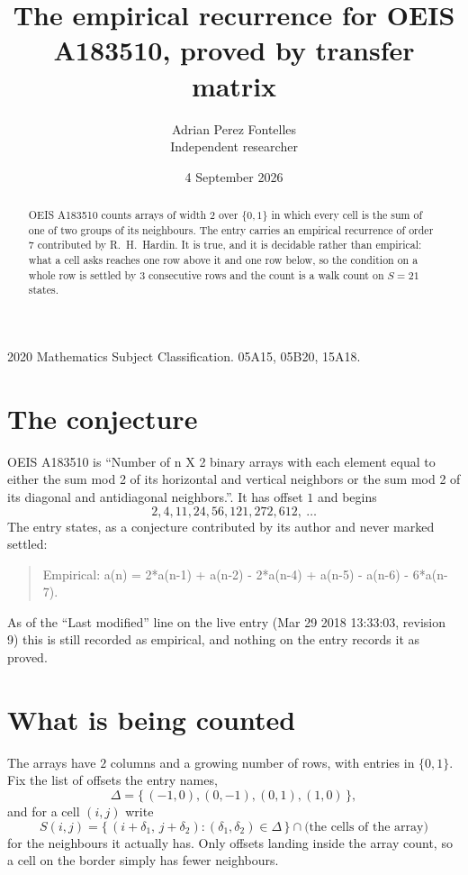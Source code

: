 \documentclass[11pt,a4paper]{article}
\title{The empirical recurrence for OEIS A183510, proved by transfer matrix}
\author{Adrian Perez Fontelles\\ \small Independent researcher}
\date{4 September 2026}
\theoremstyle{plain}
\theoremstyle{definition}
\begin{document}
\maketitle

\begin{abstract}
OEIS A183510 counts arrays of width $2$ over $\{0,1\}$ in which every cell is the sum of one of two groups of its neighbours. The entry carries an
empirical recurrence of order $7$ contributed by R.~H.~Hardin. It is true, and it is
decidable rather than empirical: what a cell asks reaches one row above
it and one row below, so the condition on a whole row is settled by
$3$ consecutive rows and the count is a walk count on $S=21$ states.
\end{abstract}

\noindent\small 2020 Mathematics Subject Classification. 05A15, 05B20, 15A18.\normalsize

\section{The conjecture}

OEIS A183510 is ``Number of n X 2 binary arrays with each element equal to either the sum mod 2 of its horizontal and vertical neighbors or the sum mod 2 of its diagonal and antidiagonal neighbors.''. It has offset $1$ and begins
\[
2, 4, 11, 24, 56, 121, 272, 612,\ \dots
\]
The entry states, as a conjecture contributed by its author and never marked settled:
\begin{quote}
Empirical: a(n) = 2*a(n-1) + a(n-2) - 2*a(n-4) + a(n-5) - a(n-6) - 6*a(n-7).
\end{quote}
As of the ``Last modified'' line on the live entry (Mar 29 2018 13:33:03, revision 9) this is still
recorded as empirical, and nothing on the entry records it as proved.

\section{What is being counted}

The arrays have $2$ columns and a growing number of rows, with entries in $\{0,1\}$. Fix the
list of offsets the entry names,
\[
\Delta=\{\,(-1,0), (0,-1), (0,1), (1,0)\,\},
\]
and for a cell $(i,j)$ write
\[
S(i,j)=\{\,(i+\delta_1,\,j+\delta_2) : (\delta_1,\delta_2)\in\Delta\,\}\cap
\text{(the cells of the array)}
\]
for the neighbours it actually has. Only offsets landing inside the array count, so a cell on
the border simply has fewer neighbours.
\end{document}
